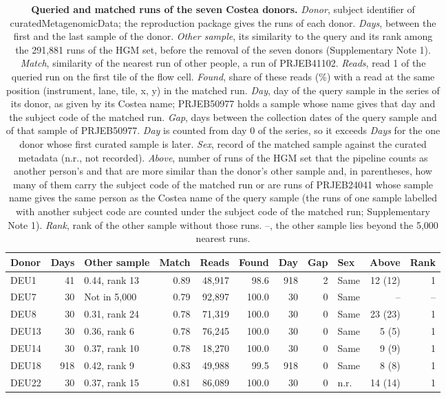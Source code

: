 \documentclass[11pt,a4paper]{article}
\begin{document}
\setcounter{table}{8}
\begin{table}[!htbp]\centering\footnotesize\setlength{\tabcolsep}{2.5pt}
\caption[Queried and matched runs of the seven Costea donors]{\textbf{Queried and matched runs of the seven Costea donors.} \textit{Donor}, subject identifier of curatedMetagenomicData; the reproduction package gives the runs of each donor. \textit{Days}, between the first and the last sample of the donor. \textit{Other sample}, its similarity to the query and its rank among the 291,881 runs of the HGM set, before the removal of the seven donors (Supplementary Note 1). \textit{Match}, similarity of the nearest run of other people, a run of PRJEB41102. \textit{Reads}, read 1 of the queried run on the first tile of the flow cell. \textit{Found}, share of these reads (\%) with a read at the same position (instrument, lane, tile, x, y) in the matched run. \textit{Day}, day of the query sample in the series of its donor, as given by its Costea name; PRJEB50977 holds a sample whose name gives that day and the subject code of the matched run. \textit{Gap}, days between the collection dates of the query sample and of that sample of PRJEB50977. \textit{Day} is counted from day 0 of the series, so it exceeds \textit{Days} for the one donor whose first curated sample is later. \textit{Sex}, record of the matched sample against the curated metadata (n.r., not recorded). \textit{Above}, number of runs of the HGM set that the pipeline counts as another person's and that are more similar than the donor's other sample and, in parentheses, how many of them carry the subject code of the matched run or are runs of PRJEB24041 whose sample name gives the same person as the Costea name of the query sample (the runs of one sample labelled with another subject code are counted under the subject code of the matched run; Supplementary Note 1). \textit{Rank}, rank of the other sample without those runs. --, the other sample lies beyond the 5,000 nearest runs.}
\begin{tabular}{lrlrrrrrlrr}
\toprule
Donor & Days & Other sample & Match & Reads & Found & Day & Gap & Sex & Above & Rank \\
\midrule
DEU1 & 41 & 0.44, rank 13 & 0.89 & 48,917 & 98.6 & 918 & 2 & Same & 12 (12) & 1 \\
DEU7 & 30 & Not in 5,000 & 0.79 & 92,897 & 100.0 & 30 & 0 & Same & -- & -- \\
DEU8 & 30 & 0.31, rank 24 & 0.78 & 71,319 & 100.0 & 30 & 0 & Same & 23 (23) & 1 \\
DEU13 & 30 & 0.36, rank 6 & 0.78 & 76,245 & 100.0 & 30 & 0 & Same & 5 (5) & 1 \\
DEU14 & 30 & 0.37, rank 10 & 0.78 & 18,270 & 100.0 & 30 & 0 & Same & 9 (9) & 1 \\
DEU18 & 918 & 0.42, rank 9 & 0.83 & 49,988 & 99.5 & 918 & 0 & Same & 8 (8) & 1 \\
DEU22 & 30 & 0.37, rank 15 & 0.81 & 86,089 & 100.0 & 30 & 0 & n.r. & 14 (14) & 1 \\
\bottomrule
\end{tabular}
\end{table}
\end{document}
